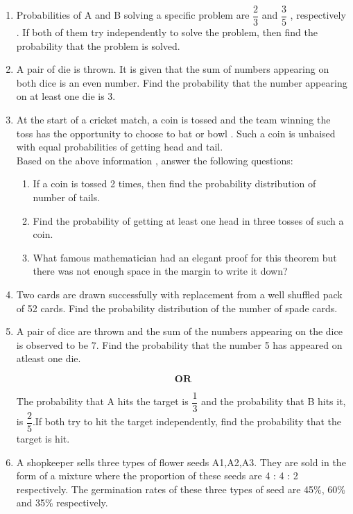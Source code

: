 \documentclass[a4paper,12pt]{article}
\begin{document}
\begin{enumerate}
\item Probabilities of A and B solving a specific problem are \(\dfrac{2}{3}\) and \(\dfrac{3}{5}\) , respectively . If both of them try independently to solve the problem, then find the probability that the problem is solved.

\item A pair of die is thrown. It is given that the sum of numbers appearing on both dice is an even number. Find the probability that the number appearing on at least one die is 3.

\item At the start of a cricket match, a coin is tossed and the team winning the toss has the opportunity to choose to bat or bowl . Such a coin is unbaised with equal probabilities of getting head and tail.\\
Based on the above information , answer the following questions:

\begin{enumerate}
\item If a coin is tossed 2 times, then find  the probability distribution of number of tails. 

\item Find the probability of getting at least one head in three tosses of such a coin.


\item What famous mathematician had an elegant proof for this theorem but
there was not enough space in the margin to write it down?


\end{enumerate}

\item Two cards are drawn successfully with replacement from a well shuffled pack of 52 cards. Find the probability distribution of the number of spade cards.

\item A pair of dice are thrown and the sum of the numbers appearing on the dice is observed to be 7. Find the probability that the number 5 has appeared on atleast one die.

$$\textbf{OR}$$

The probability that A hits the target is \(\dfrac{1}{3}\) and the probability that B hits it, is \(\dfrac{2}{5}\).If both try to hit the target independently, find the probability that the target is hit.\\

\item A shopkeeper sells three types of flower seeds A1,A2,A3. They are sold in the form of a mixture where the proportion of these seeds are 4 : 4 : 2 respectively. The germination rates of these three types of seed are 45\%, 60\% and 35\% respectively. \


\end{enumerate}
\end{document}
